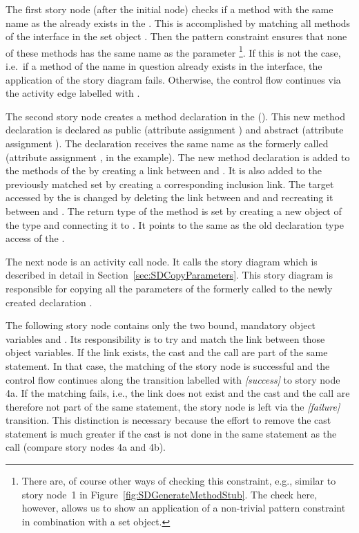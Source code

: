 The first story node (after the initial node) checks if a method with the same name as the  already exists in the .
This is accomplished by matching all methods of the interface in the set object .
Then the pattern constraint ensures that none of these methods has the same name as the parameter \footnote{There are, of course other ways of checking this constraint, e.g., similar to story node~1 in Figure~\ref{fig:SDGenerateMethodStub}. The check here, however, allows us to show an application of a non-trivial pattern constraint in combination with a set object.}.
If this is not the case, i.e.\ if a method of the name in question already exists in the interface, the application of the story diagram fails.
Otherwise, the control flow continues via the activity edge labelled with \fe{[success]}.

The second story node creates a method declaration in the  (). This new method declaration is declared as public (attribute assignment ) and abstract (attribute assignment ). The declaration receives the same name as the formerly called  (attribute assignment ,  in the example). The new method declaration is added to the methods of the  by creating a  link between  and . It is also added to the previously matched set  by creating a corresponding inclusion link. The target accessed by the  is changed by deleting the link between  and  and recreating it between  and . The return type of the method is set by creating a new object  of the type  and connecting it to . It points to the same  as the old declaration type access of the .

The next node is an activity call node. It calls the story diagram  which is described in detail in Section~\ref{sec:SDCopyParameters}. This story diagram is responsible for copying all the parameters of the formerly called  to the newly created declaration .

The following story node contains only the two bound, mandatory object variables  and . Its responsibility is to try and match the link  between those object variables. If the link exists, the cast and the call are part of the same statement. In that case, the matching of the story node is successful and the control flow continues along the transition labelled with \emph{[success]} to story node 4a. If the matching fails, i.e., the link does not exist and the cast and the call are therefore not part of the same statement, the story node is left via the \emph{[failure]} transition. This distinction is necessary because the effort to remove the cast statement is much greater if the cast is not done in the same statement as the call (compare story nodes 4a and 4b).

